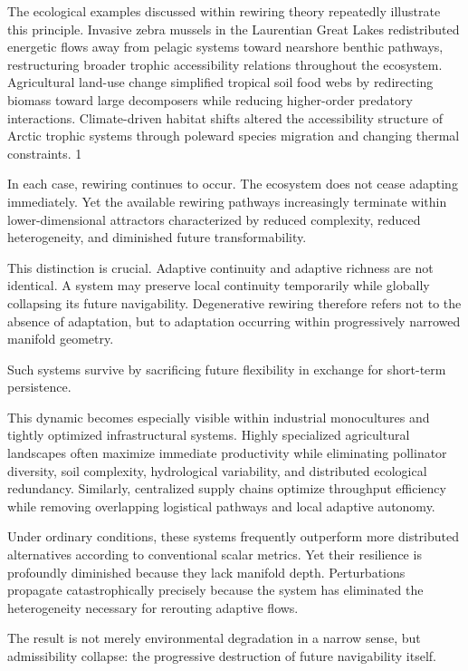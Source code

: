 \documentclass[11pt,a4paper]{article}
\begin{document}
The ecological examples discussed within rewiring theory repeatedly illustrate this principle. Invasive zebra mussels in the Laurentian Great Lakes redistributed energetic flows away from pelagic systems toward nearshore benthic pathways, restructuring broader trophic accessibility relations throughout the ecosystem. Agricultural land-use change simplified tropical soil food webs by redirecting biomass toward large decomposers while reducing higher-order predatory interactions. Climate-driven habitat shifts altered the accessibility structure of Arctic trophic systems through poleward species migration and changing thermal constraints. 1

In each case, rewiring continues to occur. The ecosystem does not cease adapting immediately. Yet the available rewiring pathways increasingly terminate within lower-dimensional attractors characterized by reduced complexity, reduced heterogeneity, and diminished future transformability.

This distinction is crucial. Adaptive continuity and adaptive richness are not identical. A system may preserve local continuity temporarily while globally collapsing its future navigability. Degenerative rewiring therefore refers not to the absence of adaptation, but to adaptation occurring within progressively narrowed manifold geometry.

Such systems survive by sacrificing future flexibility in exchange for short-term persistence.

This dynamic becomes especially visible within industrial monocultures and tightly optimized infrastructural systems. Highly specialized agricultural landscapes often maximize immediate productivity while eliminating pollinator diversity, soil complexity, hydrological variability, and distributed ecological redundancy. Similarly, centralized supply chains optimize throughput efficiency while removing overlapping logistical pathways and local adaptive autonomy.

Under ordinary conditions, these systems frequently outperform more distributed alternatives according to conventional scalar metrics. Yet their resilience is profoundly diminished because they lack manifold depth. Perturbations propagate catastrophically precisely because the system has eliminated the heterogeneity necessary for rerouting adaptive flows.

The result is not merely environmental degradation in a narrow sense, but admissibility collapse: the progressive destruction of future navigability itself.
\end{document}
